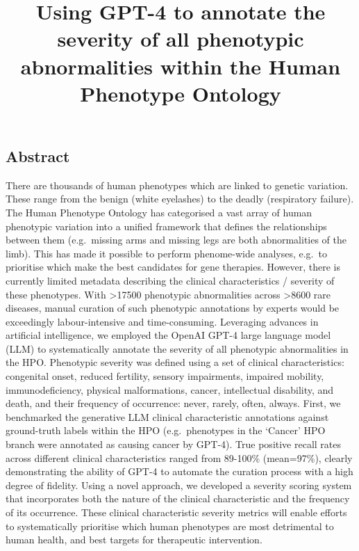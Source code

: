 \documentclass[
]{agujournal2019}
\begin{document}
\title{Using GPT-4 to annotate the severity of all phenotypic
abnormalities within the Human Phenotype Ontology}







\subsection{Abstract}\label{abstract}

There are thousands of human phenotypes which are linked to genetic
variation. These range from the benign (white eyelashes) to the deadly
(respiratory failure). The Human Phenotype Ontology has categorised a
vast array of human phenotypic variation into a unified framework that
defines the relationships between them (e.g.~missing arms and missing
legs are both abnormalities of the limb). This has made it possible to
perform phenome-wide analyses, e.g.~to prioritise which make the best
candidates for gene therapies. However, there is currently limited
metadata describing the clinical characteristics / severity of these
phenotypes. With \textgreater17500 phenotypic abnormalities across
\textgreater8600 rare diseases, manual curation of such phenotypic
annotations by experts would be exceedingly labour-intensive and
time-consuming. Leveraging advances in artificial intelligence, we
employed the OpenAI GPT-4 large language model (LLM) to systematically
annotate the severity of all phenotypic abnormalities in the HPO.
Phenotypic severity was defined using a set of clinical characteristics:
congenital onset, reduced fertility, sensory impairments, impaired
mobility, immunodeficiency, physical malformations, cancer, intellectual
disability, and death, and their frequency of occurrence: never, rarely,
often, always. First, we benchmarked the generative LLM clinical
characteristic annotations against ground-truth labels within the HPO
(e.g.~phenotypes in the `Cancer' HPO branch were annotated as causing
cancer by GPT-4). True positive recall rates across different clinical
characteristics ranged from 89-100\% (mean=97\%), clearly demonstrating
the ability of GPT-4 to automate the curation process with a high degree
of fidelity. Using a novel approach, we developed a severity scoring
system that incorporates both the nature of the clinical characteristic
and the frequency of its occurrence. These clinical characteristic
severity metrics will enable efforts to systematically prioritise which
human phenotypes are most detrimental to human health, and best targets
for therapeutic intervention.
\end{document}
